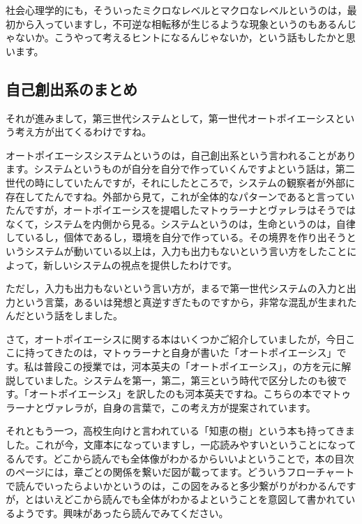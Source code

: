 \documentclass{ltjsbook}
\begin{document}
社会心理学的にも，そういったミクロなレベルとマクロなレベルというのは，最初から入っていますし，不可逆な相転移が生じるような現象というのもあるんじゃないか。こうやって考えるヒントになるんじゃないか，という話もしたかと思います。

\subsection{自己創出系のまとめ}

それが進みまして，第三世代システムとして，第一世代オートポイエーシスという考え方が出てくるわけですね。

オートポイエーシスシステムというのは，自己創出系という言われることがあります。システムというものが自分を自分で作っていくんですよという話は，第二世代の時にしていたんですが，それにしたところで，システムの観察者が外部に存在してたんですね。外部から見て，これが全体的なパターンであると言っていたんですが，オートポイエーシスを提唱したマトゥラーナとヴァレラはそうではなくて，システムを内側から見る。システムというのは，生命というのは，自律しているし，個体であるし，環境を自分で作っている。その境界を作り出そうというシステムが動いている以上は，入力も出力もないという言い方をしたことによって，新しいシステムの視点を提供したわけです。

ただし，入力も出力もないという言い方が，まるで第一世代システムの入力と出力という言葉，あるいは発想と真逆すぎたものですから，非常な混乱が生まれたんだという話をしました。

さて，オートポイエーシスに関する本はいくつかご紹介していましたが，今日ここに持ってきたのは，マトゥラーナと自身が書いた「オートポイエーシス」です\parencite{Maturana_Varela}。私は普段この授業では，河本英夫の「オートポイエーシス」\parencite{KawamotoHideo}，の方を元に解説していました。システムを第一，第二，第三という時代で区分したのも彼です。「オートポイエーシス」\parencite{Maturana_Varela}を訳したのも河本英夫ですね。こちらの本でマトゥラーナとヴァレラが，自身の言葉で，この考え方が提案されています。

それともう一つ，高校生向けと言われている「知恵の樹」という本も持ってきました\parencite{Chienoki}。これが今，文庫本になっていますし，一応読みやすいということになってるんです。どこから読んでも全体像がわかるからいいよということで，本の目次のページには，章ごとの関係を繋いだ図が載ってます。どういうフローチャートで読んでいったらよいかというのは，この図をみると多少繋がりがわかるんですが，とはいえどこから読んでも全体がわかるよということを意図して書かれているようです。興味があったら読んでみてください。
\end{document}
